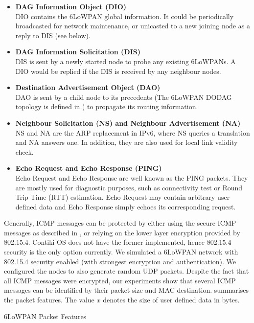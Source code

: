 \begin{itemize}
	\item \textbf{DAG Information Object (DIO)} \\
	DIO contains the 6LoWPAN global information. It could be periodically broadcasted for network maintenance, or unicasted to a new joining node as a reply to DIS (see below).
	\item \textbf{DAG Information Solicitation (DIS)} \\
	DIS is sent by a newly started node to probe any existing 6LoWPANs. A DIO would be replied if the DIS is received by any neighbour nodes.
	\item \textbf{Destination Advertisement Object (DAO)} \\
	DAO is sent by a child node to its precedents (The 6LoWPAN DODAG topology is defined in \cite{rfc6550}) to propagate its routing information.
	\item \textbf{Neighbour Solicitation (NS) and Neighbour Advertisement (NA)} \\
	NS and NA are the ARP replacement in IPv6, where NS queries a translation and NA answers one. In addition, they are also used for local link validity check.
	\item \textbf{Echo Request and Echo Response (PING)} \\
	Echo Request and Echo Response are well known as the PING packets. They are mostly used for diagnostic purposes, such as connectivity test or Round Trip Time (RTT) estimation. Echo Request may contain arbitrary user defined data and Echo Response simply echoes its corresponding request.
\end{itemize}

Generally, ICMP messages can be protected by either using the secure ICMP messages as described in \cite{rfc4443}, or relying on the lower layer encryption provided by 802.15.4. Contiki OS does not have the former implemented, hence 802.15.4 security is the only option currently. We simulated a 6LoWPAN network with 802.15.4 security enabled (with strongest encryption and authentication). We configured the nodes to also generate random UDP packets. Despite the fact that all ICMP messages were encrypted, our experiments show that several ICMP messages can be identified by their packet size and MAC destination.  summarises the packet features. The value $x$ denotes the size of user defined data in bytes.

\begin{table}
	\center
	
	\caption{6LoWPAN Packet Features\label{IcmpPacketFeature}}
\end{table}

